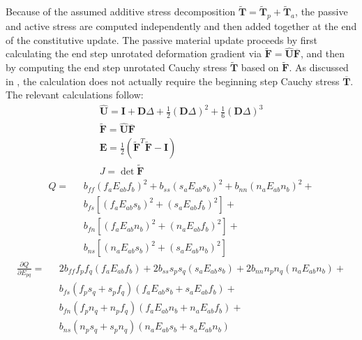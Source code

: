 Because of the assumed additive stress decomposition $\tilde{\bm{T}} = \tilde{\bm{T}}_p + \tilde{\bm{T}}_a$, the passive and active stress are computed independently and then added together at the end of the constitutive update. The passive material update proceeds by first calculating the end step unrotated deformation gradient via $\tilde{\bm{F}} = \hat{\bm{U}}\overline{\bm{F}}$, and then by computing the end step unrotated Cauchy stress $\tilde{\bm{T}}$ based on $\tilde{\bm{F}}$. As discussed in , the calculation does not actually require the beginning step Cauchy stress $\overline{\bm{T}}$. The relevant calculations follow:
\begin{gather}
\hat{\bm{U}} = \bm{I} + \bm{D}\Delta + \frac{1}{2}(\bm{D}\Delta)^2 + \frac{1}{6}(\bm{D}\Delta)^3 \\
\tilde{\bm{F}} = \hat{\bm{U}}\overline{\bm{F}} \\
\bm{E} = \frac{1}{2}(\tilde{\bm{F}}^T \tilde{\bm{F}} - \bm{I}) \\
J  = \det{\tilde{\bm{F}}}
\end{gather}
\begin{equation}
\begin{aligned}
Q =\text{\ } &b_{ff}\left(f_aE_{ab}f_b\right)^2  + b_{ss}\left(s_aE_{ab}s_b\right)^2 + b_{nn}\left(n_aE_{ab}n_b\right)^2 +\\
& b_{fs}\left[\left(f_aE_{ab}s_b\right)^2 + \left(s_aE_{ab}f_b\right)^2\right] +\\
& b_{fn}\left[\left(f_aE_{ab}n_b\right)^2 + \left(n_aE_{ab}f_b\right)^2\right] +\\
& b_{ns}\left[\left(n_aE_{ab}s_b\right)^2 + \left(s_aE_{ab}n_b\right)^2\right]
\end{aligned}
\end{equation}
\begin{equation}
\begin{aligned}
\frac{\partial Q}{\partial E_{pq}} = \text{\ } &2b_{ff}f_pf_q\left(f_aE_{ab}f_b\right) + 2b_{ss}s_ps_q\left(s_aE_{ab}s_b\right) + 2b_{nn}n_pn_q\left(n_aE_{ab}n_b\right) +\\
& b_{fs}\left(f_ps_q + s_pf_q\right)\left(f_aE_{ab}s_b + s_aE_{ab}f_b\right) +\\
& b_{fn}\left(f_pn_q + n_pf_q\right)\left(f_aE_{ab}n_b + n_aE_{ab}f_b\right) +\\
& b_{ns}\left(n_ps_q + s_pn_q\right)\left(n_aE_{ab}s_b + s_aE_{ab}n_b\right)
\end{aligned}
\end{equation}

